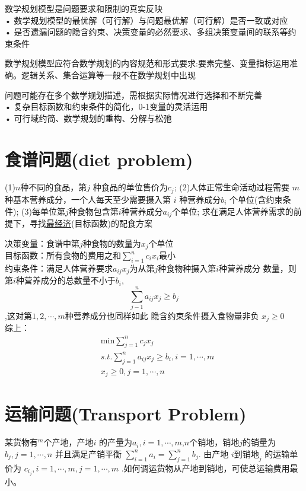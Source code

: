 \documentclass[10t, a4paper, oneside]{ctexbook}
\begin{document}
数学规划模型是问题要求和限制的真实反映\\
• 数学规划模型的最优解（可行解）与问题最优解（可行解）是否一致或对应\\
• 是否遗漏问题的隐含约束、决策变量的必然要求、多组决策变量间的联系等约束条件

数学规划模型应符合数学规划的内容规范和形式要求:要素完整、变量指标运用准确。逻辑关系、集合运算等一般不在数学规划中出现

问题可能存在多个数学规划描述，需根据实际情况进行选择和不断完善\\
• 复杂目标函数和约束条件的简化，0-1变量的灵活运用\\
• 可行域约简、数学规划的重构、分解与松弛

\section{食谱问题(diet problem)}
(1)$n$种不同的食品，第$j$ 种食品的单位售价为$c_j$;
(2)人体正常生命活动过程需要 $m$ 种基本营养成分，一个人每天至少需要摄入第 $i$ 种营养成分$b_i$ 个单位(含约束条件);
(3)每单位第$j$种食物包含第$i$种营养成分$a_{ij}$个单位;
求在满足人体营养需求的前提下，寻找\underline{最经济}(目标函数)的配食方案

决策变量：食谱中第$j$种食物的数量为$x_j$个单位\\
目标函数：所有食物的费用之和$\sum_{i=  1}^n c_{i}x_i$最小\\
约束条件：满足人体营养要求$a_{ij}x_j$为从第$j$种食物种摄入第$i$种营养成分
数量，则第$i$种营养成分的总数量不小于$b_i$, $$\sum_{j - 1}^n a_{ij}x_j \ge b_j$$,这对第$1,2,\cdots,m$种营养成分也同样如此
隐含约束条件摄入食物量非负 $x_j \ge 0$\\
综上：
$$\begin{aligned}
    &\text{min} \sum_{j=1}^{n}c_{j}x_{j}  \\
    &s.t. \sum_{j=1}^{n}a_{ij}x_{j}\geq b_{i},i=1,\cdots,m  \\
    &x_{j}\geq0,j=1,\cdots,n
    \end{aligned}$$

\section{运输问题(Transport Problem)}
某货物有$^{m}$个产地，产地$i$ 的产量为$a_i,i=1,\cdots,m$,$n$个销地，销地$j$的销量为 $b_j,j=1,\cdots,n$
并且满足产销平衡 $\sum_{i=1}^{n}a_{i}=\sum_{j= 1}^{n}b_j$. 
由产地 $i\text{到销地}_j$ 的运输单价为 $c_{i_j},i=1,\cdots,m,j=1, \cdots, m$ .如何调运货物从产地到销地，可使总运输费用最小。
\end{document}

